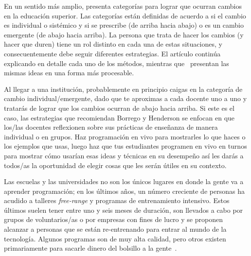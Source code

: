 En un sentido más amplio,
\cite{Borr2014} presenta categorías para lograr que ocurran cambios en la educación superior.
Las categorías están definidas de acuerdo a si el cambio es individual o 
sistémico y si se prescribe (de arriba hacia abajo) o es un cambio emergente (de abajo hacia arriba). 
La persona que trata de hacer los cambios (y hacer que duren)
tiene un rol distinto en cada una de estas situaciones,
y consecuentemente debe seguir diferentes estrategias.
El artículo continúa explicando en detalle cada uno de los métodos,
mientras que~\cite{Hend2015a,Hend2015b} presentan las mismas ideas en una forma más 
procesable.

Al llegar a una institución,
probablemente en principio caigas en la categoría de cambio individual/emergente,
dado que te aproximas a cada docente uno a uno
y tratarás de lograr que los cambios ocurran de abajo hacia arriba.
Si este es el caso,
las estrategias que recomiendan Borrego y Henderson se enfocan
en que los/las docentes reflexionen sobre sus prácticas de enseñanza de manera individual o en grupos.
Haz programación en vivo para mostrarles lo que haces o los ejemplos que usas,
luego haz que tus estudiantes programen en vivo en turnos 
para mostrar cómo usarían esas ideas y técnicas en su desempeño
así les darás a todos/as la oportunidad de elegir cosas que les serán útiles en su contexto.


Las escuelas y las universidades no son los únicos lugares en donde la gente va a aprender programación;
en los últimos años, un número creciente de personas ha acudido a talleres \emph{free-range} y programas de entrenamiento intensivo.
Estos últimos suelen tener entre uno y seis meses de duración,
son llevados a cabo por grupos de voluntarios/as o por empresas con fines de lucro
y se proponen alcanzar a personas que se están re-entrenando para entrar al mundo de la tecnología.
Algunos programas son de muy alta calidad,
pero otros existen primariamente para sacarle dinero del bolsillo a la gente~\cite{McMi2017}.
 
